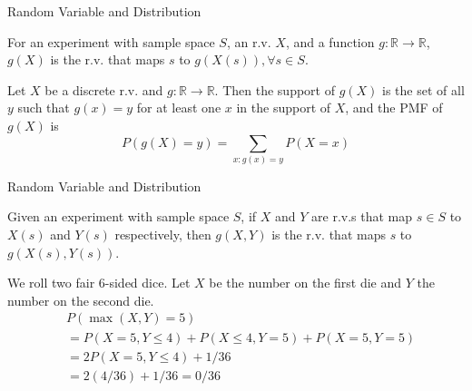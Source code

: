 \documentclass{beamer}
\newcommand{\mbb}[1]{\mathbb{#1}}
\begin{document}
\begin{frame}{Random Variable and Distribution}
    \begin{definition}[Function of an r.v.]
        For an experiment with sample space $S$, an r.v. $X$, and a function $g : \mbb{R} \rightarrow \mbb{R}$, $g(X)$ is the r.v. that maps $s$ to $g(X(s)), \forall s \in S$.
    \end{definition}
    \begin{theorem}[PMF of $g(X)$]
        Let $X$ be a discrete r.v. and $g : \mbb{R}\rightarrow \mbb{R}$. Then the support of $g(X)$ is the set of all $y$ such that $g(x) = y$ for at least one $x$ in the support of $X$, and the PMF of $g(X)$ is \[P(g(X)=y) = \sum_{x:g(x)=y} P(X=x)\]
    \end{theorem}
\end{frame}

\begin{frame}{Random Variable and Distribution}
    \begin{definition}
        Given an experiment with sample space $S$, if $X$ and $Y$ are r.v.s that map $s \in S$ to $X(s)$ and $Y(s)$ respectively, then $g(X,Y)$ is the r.v. that maps $s$ to $g(X(s), Y(s))$.
    \end{definition}
    \begin{example}
        We roll two fair 6-sided dice. Let $X$ be the number on the first die and $Y$ the number on the second die.
        \[
            \begin{aligned}
                &P(\max(X,Y)=5) \\
                &= P(X=5, Y \leq 4) + P(X \leq 4 , Y=5) + P(X=5, Y=5)\\
                &=2P(X=5, Y\leq 4) + 1/36\\
                &=2(4/36) + 1/36  = 0/36
            \end{aligned}
        \]
    \end{example}
\end{frame}
\end{document}
